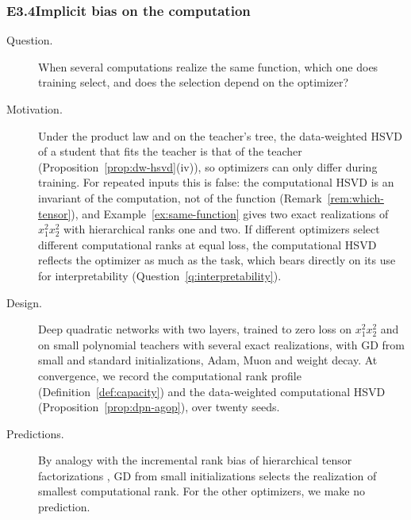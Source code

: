\documentclass[11pt]{article}
\theoremstyle{definition}
\numberwithin{equation}{section}
\begin{document}
\subsubsection*{E3.4\quad Implicit bias on the computation}
\begin{description}
\item[Question.] When several computations realize the same function, which one does training select, and does the selection depend on the optimizer?
\item[Motivation.] Under the product law and on the teacher's tree, the data-weighted HSVD of a student that fits the teacher is that of the teacher (Proposition~\ref{prop:dw-hsvd}(iv)), so optimizers can only differ during training. For repeated inputs this is false: the computational HSVD is an invariant of the computation, not of the function (Remark~\ref{rem:which-tensor}), and Example~\ref{ex:same-function} gives two exact realizations of $x_1^2x_2^2$ with hierarchical ranks one and two. If different optimizers select different computational ranks at equal loss, the computational HSVD reflects the optimizer as much as the task, which bears directly on its use for interpretability (Question~\ref{q:interpretability}).
\item[Design.] Deep quadratic networks with two layers, trained to zero loss on $x_1^2x_2^2$ and on small polynomial teachers with several exact realizations, with GD from small and standard initializations, Adam, Muon and weight decay. At convergence, we record the computational rank profile (Definition~\ref{def:capacity}) and the data-weighted computational HSVD (Proposition~\ref{prop:dpn-agop}), over twenty seeds.
\item[Predictions.] By analogy with the incremental rank bias of hierarchical tensor factorizations \citep{razin2022implicit}, GD from small initializations selects the realization of smallest computational rank. For the other optimizers, we make no prediction.
\end{description}
\end{document}
